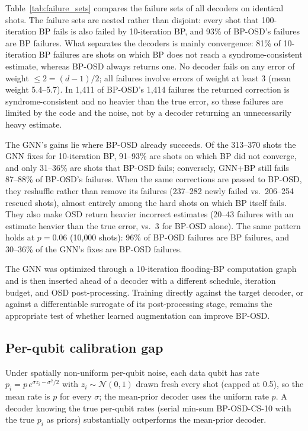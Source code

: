 \documentclass[a4paper,twocolumn,11pt,nopdfoutputerror]{quantumarticle}
\begin{document}
Table~\ref{tab:failure_sets} compares the failure sets of all decoders on
identical shots. The failure sets are nested rather than disjoint: every
shot that 100-iteration BP fails is also failed by 10-iteration BP, and
93\% of BP-OSD's failures are BP failures. What separates the decoders is
mainly convergence: 81\% of 10-iteration BP failures are shots on which BP
does not reach a syndrome-consistent estimate, whereas BP-OSD always
returns one. No decoder fails on any error of weight $\le 2=(d-1)/2$;
all failures involve errors of weight at least 3 (mean weight 5.4--5.7).
In 1{,}411 of BP-OSD's 1{,}414 failures the returned correction is
syndrome-consistent and no heavier than the true error, so these failures
are limited by the code and the noise, not by a decoder returning an
unnecessarily heavy estimate.

The GNN's gains lie where BP-OSD already succeeds. Of the 313--370 shots
the GNN fixes for 10-iteration BP, 91--93\% are shots on which BP did not
converge, and only 31--36\% are shots that BP-OSD fails; conversely,
GNN+BP still fails 87--88\% of BP-OSD's failures. When the same
corrections are passed to BP-OSD, they reshuffle rather than remove its
failures (237--282 newly failed vs.\ 206--254 rescued shots), almost
entirely among the hard shots on which BP itself fails. They also make
OSD return heavier incorrect estimates (20--43 failures with an estimate
heavier than the true error, vs.\ 3 for BP-OSD alone). The same pattern
holds at $p=0.06$ (10{,}000 shots): 96\% of BP-OSD failures are BP
failures, and 30--36\% of the GNN's fixes are BP-OSD failures.

The GNN was optimized through a 10-iteration flooding-BP computation graph
and is then inserted ahead of a decoder with a different schedule,
iteration budget, and OSD post-processing. Training directly against the
target decoder, or against a differentiable surrogate of its
post-processing stage, remains the appropriate test of whether learned
augmentation can improve BP-OSD.

\subsection{Per-qubit calibration gap}\label{sec:oraclegap}

Under spatially non-uniform per-qubit noise, each data qubit has rate
$p_i=p\,e^{\sigma z_i-\sigma^2/2}$ with $z_i\sim\mathcal N(0,1)$ drawn
fresh every shot (capped at 0.5), so the mean rate is $p$ for every
$\sigma$; the mean-prior decoder uses the uniform rate $p$. A decoder knowing the true per-qubit rates
(serial min-sum BP-OSD-CS-10 with the true $p_i$ as priors) substantially
outperforms the mean-prior decoder.
\end{document}
